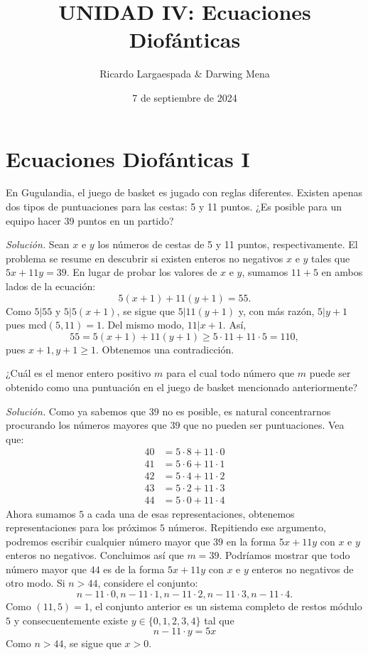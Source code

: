 \documentclass[12pt]{scrartcl}
\title{UNIDAD IV: Ecuaciones Diofánticas}
\author{Ricardo Largaespada & Darwing Mena}
\date{7 de septiembre de 2024}
\begin{document}
\section{Ecuaciones Diofánticas I}
\begin{example}
En Gugulandia, el juego de basket es jugado con reglas diferentes.
Existen apenas dos tipos de puntuaciones para las cestas: 5 y 11 puntos. ¿Es posible para un equipo hacer 39 puntos en un partido?
\end{example}

\textit{Solución.} Sean $x$ e $y$ los números de cestas de 5 y 11 puntos, respectivamente. El problema se resume en descubrir si existen enteros no negativos $x$ e $y$ tales que $5x+11y=39$. En lugar de probar los valores de $x$ e $y$, sumamos $11+5$ en ambos lados de la ecuación: $$5(x+1)+11(y+1)=55.$$ Como $5|55$ y $5|5(x+1)$, se sigue que $5|11(y+1)$ y, con más razón, $5|y+1$ pues $\mbox{mcd}(5,11)=1$. Del mismo modo, $11|x+1$. Así, $$55=5(x+1)+11(y+1)\ge 5\cdot 11+11\cdot 5=110,$$ pues $x+1,y+1\ge 1$. Obtenemos una contradicción.

\begin{example}
¿Cuál es el menor entero positivo $m$ para el cual todo número que $m$ puede ser obtenido como una puntuación en el juego de basket mencionado anteriormente?
\end{example}

\textit{Solución.} Como ya sabemos que $39$ no es posible, es natural concentrarnos procurando los números mayores que $39$ que no pueden ser puntuaciones. Vea que:
\begin{align*}
40 &= 5\cdot 8 +11\cdot 0\\
41 &= 5\cdot 6 +11\cdot 1\\
42 &= 5\cdot 4 +11\cdot 2\\
43 &= 5\cdot 2 +11\cdot 3\\
44 &= 5\cdot 0 +11\cdot 4
\end{align*}
Ahora sumamos $5$ a cada una de esas representaciones, obtenemos representaciones para los próximos $5$ números. Repitiendo ese argumento, podremos escribir cualquier número mayor que $39$ en la forma $5x+11y$ con $x$ e $y$ enteros no negativos. Concluimos así que $m=39$. Podríamos mostrar que todo número mayor que $44$ es de la forma $5x+11y$ con $x$ e $y$ enteros no negativos de otro modo. Si $n>44$, considere el conjunto: $$n-11\cdot 0,n-11\cdot 1,n-11\cdot 2,n-11\cdot 3,n-11\cdot 4.$$ Como $(11,5)=1$, el conjunto anterior es un sistema completo de restos módulo $5$ y consecuentemente existe $y\in\{0,1,2,3,4\}$ tal que $$n-11\cdot y=5x$$ Como $n>44$, se sigue que $x>0$.
\end{document}
